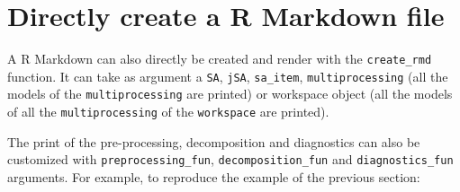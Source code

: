 \documentclass[
]{article}
\begin{document}
\section{Directly create a R Markdown
file}\label{directly-create-a-r-markdown-file}

A R Markdown can also directly be created and render with the
\texttt{create\_rmd} function. It can take as argument a \texttt{SA},
\texttt{jSA}, \texttt{sa\_item}, \texttt{multiprocessing} (all the
models of the \texttt{multiprocessing} are printed) or workspace object
(all the models of all the \texttt{multiprocessing} of the
\texttt{workspace} are printed).

The print of the pre-processing, decomposition and diagnostics can also
be customized with \texttt{preprocessing\_fun},
\texttt{decomposition\_fun} and \texttt{diagnostics\_fun} arguments. For
example, to reproduce the example of the previous section:
\end{document}
